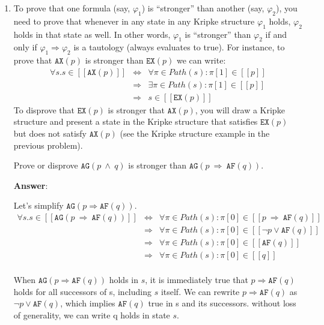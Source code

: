\documentclass[11pt]{article}
\newcommand{\ax}[1]{\texttt{AX}(#1)}
\newcommand{\ex}[1]{\texttt{EX}(#1)}
\newcommand{\af}[1]{\texttt{AF}(#1)}
\newcommand{\ag}[1]{\texttt{AG}(#1)}
\newcommand{\sem}[1]{[\!\![#1]\!\!]}
\begin{document}
\begin{enumerate}
\item
To prove that one formula (say, $\varphi_1$) is ``stronger'' than
another (say, $\varphi_2$), you need to prove that whenever in any
state in any Kripke structure $\varphi_1$ holds, $\varphi_2$ holds in
that state as well. In other words, $\varphi_1$ is ``stronger'' than
$\varphi_2$ if and only if $\varphi_1\Rightarrow\varphi_2$ is a
tautology (always evaluates to true). For instance, to prove that
$\ax{p}$ is stronger than $\ex{p}$ we can write:
\[
\begin{array}{rcl}
  \forall s. s\in \sem{\ax{p}} & \Leftrightarrow & \forall \pi\in Path(s): \pi[1] \in \sem{p} \\
                               & \Rightarrow &     \exists \pi\in Path(s): \pi[1] \in \sem{p} \\
                               & \Rightarrow & s \in \sem{\ex{p}}
\end{array}
\]
To disprove that $\ex{p}$ is stronger that $\ax{p}$, you will draw a
Kripke structure and present a state in the Kripke structure that
satisfies $\ex{p}$ but does not satisfy $\ax{p}$ (see the Kripke
structure example in the previous problem).

Prove or disprove $\ag{p\ \land\ q}$ is stronger than $\ag{p\ \Rightarrow\ \af{q}}$.

\textbf{Answer}:

Let's simplify $\ag{p \Rightarrow \af{q}}$. 
\[
\begin{array}{rcl}
  \forall s. s\in \sem{\ag{p\ \Rightarrow\ \af{q}}} & \Leftrightarrow & \forall \pi\in Path(s): \pi[0] \in \sem{p\ \Rightarrow\ \af{q}} \\
                               & \Rightarrow &     \forall \pi\in Path(s): \pi[0] \in \sem{ \neg p \lor \af{q}} \\
                               & \Rightarrow &     \forall \pi\in Path(s): \pi[0] \in \sem{ \af{q}} \\
                               & \Rightarrow &     \forall \pi\in Path(s): \pi[0] \in \sem{ {q}} \\
\end{array}
\]

When $\ag{p \Rightarrow \af{q}}$ holds in $s$, it is immediately true that $p \Rightarrow \af{q}$ holds for all successors of s, including $s$ itself. We can rewrite $p \Rightarrow \af{q}$ as $\neg p \lor \af{q}$, which implies $\af{q}$ true in s and its successors. without loss of generality, we can write q holds in state $s$. 


\end{enumerate}
\end{document}
